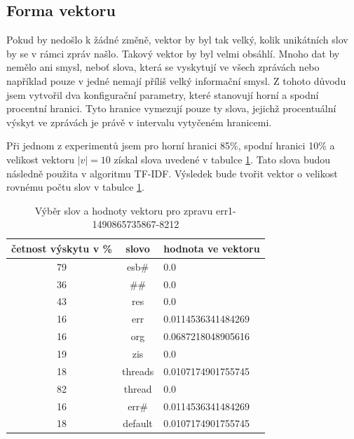 \documentclass[thesis=M,czech]{FITthesis}[2012/10/20]
\begin{document}
		\subsection{Forma vektoru}
		Pokud by nedošlo k žádné změně, vektor by byl tak velký, kolik unikátních slov by se v rámci zpráv našlo. Takový vektor by byl velmi obsáhlí. Mnoho dat by nemělo ani smysl, neboť slova, která se vyskytují ve všech zprávách nebo například pouze v jedné nemají příliš velký informační smysl. Z tohoto důvodu jsem vytvořil dva konfigurační parametry, které stanovují horní a spodní procentní hranici. Tyto hranice vymezují pouze ty slova, jejichž procentuální výskyt ve zprávách je právě v intervalu vytyčeném hranicemi.  
		
		Při jednom z experimentů jsem pro horní hranici 85\%, spodní hranici 10\%  a velikost vektoru $|v| = 10$ získal slova uvedené v tabulce \ref{tab:vector-err}. Tato slova budou následně použita v algoritmu TF-IDF. Výsledek bude tvořit vektor o velikost rovnému počtu slov v tabulce \ref{tab:vector-err}.
		
		\begin{table}[htb]\centering
			\centering
			\caption{Výběr slov a hodnoty vektoru pro zpravu err1-1490865735867-8212}
			\label{tab:vector-err}
			\begin{tabular}{|c|c|l|}
				\hline
				\textbf{četnost výskytu v \%} & \textbf{slovo} & \multicolumn{1}{c|}{\textbf{hodnota ve vektoru}} \\ \hline
				79                            & esb\#          & 0.0                                                               \\ \hline
				36                            & \#\#           & 0.0                                                               \\ \hline
				43                            & res            & 0.0                                                               \\ \hline
				16                            & err            & 0.0114536341484269                                                \\ \hline
				16                            & org            & 0.0687218048905616                                                \\ \hline
				19                            & zis            & 0.0                                                               \\ \hline
				18                            & threads        & 0.0107174901755745                                                \\ \hline
				82                            & thread         & 0.0                                                               \\ \hline
				16                            & err\#          & 0.0114536341484269                                                \\ \hline
				18                            & default        & 0.0107174901755745                                                \\ \hline
			\end{tabular}
		\end{table}
		
\end{document}
